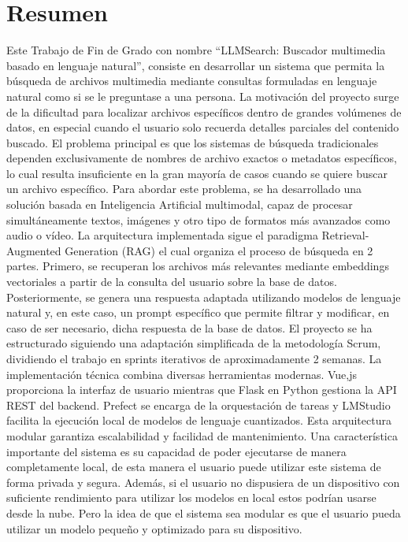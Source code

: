 \chapter*{Resumen}
\thispagestyle{empty}
Este Trabajo de Fin de Grado con nombre “LLMSearch: Buscador multimedia basado en lenguaje natural”, consiste en desarrollar un sistema que permita la búsqueda de archivos multimedia mediante consultas formuladas en lenguaje natural como si se le preguntase a una persona. La motivación del proyecto surge de la dificultad para localizar archivos específicos dentro de grandes volúmenes de datos, en especial cuando el usuario solo recuerda detalles parciales del contenido buscado.
El problema principal es que los sistemas de búsqueda tradicionales dependen exclusivamente de nombres de archivo exactos o metadatos específicos, lo cual resulta insuficiente en la gran mayoría de casos cuando se quiere buscar un archivo específico.
Para abordar este problema, se ha desarrollado una solución basada en Inteligencia Artificial multimodal, capaz de procesar simultáneamente textos, imágenes y otro tipo de formatos más avanzados como audio o vídeo.
La arquitectura implementada sigue el paradigma Retrieval-Augmented Generation (RAG) el cual organiza el proceso de búsqueda en 2 partes. Primero, se recuperan los archivos más relevantes mediante embeddings vectoriales a partir de la consulta del usuario sobre la base de datos. Posteriormente, se genera una respuesta adaptada utilizando modelos de lenguaje natural y, en este caso, un prompt específico que permite filtrar y modificar, en caso de ser necesario, dicha respuesta de la base de datos.
El proyecto se ha estructurado siguiendo una adaptación simplificada de la metodología Scrum, dividiendo el trabajo en sprints iterativos de aproximadamente 2 semanas.
La implementación técnica combina diversas herramientas modernas. Vue,js proporciona la interfaz de usuario mientras que Flask en Python gestiona la API REST del backend. Prefect se encarga de la orquestación de tareas y LMStudio facilita la ejecución local de modelos de lenguaje cuantizados. Esta arquitectura modular garantiza escalabilidad y facilidad de mantenimiento.
Una característica importante del sistema es su capacidad de poder ejecutarse de manera completamente local, de esta manera el usuario puede utilizar este sistema de forma privada y segura. Además, si el usuario no dispusiera de un dispositivo con suficiente rendimiento para utilizar los modelos en local estos podrían usarse desde la nube. Pero la idea de que el sistema sea modular es que el usuario pueda utilizar un modelo pequeño y optimizado para su dispositivo.
